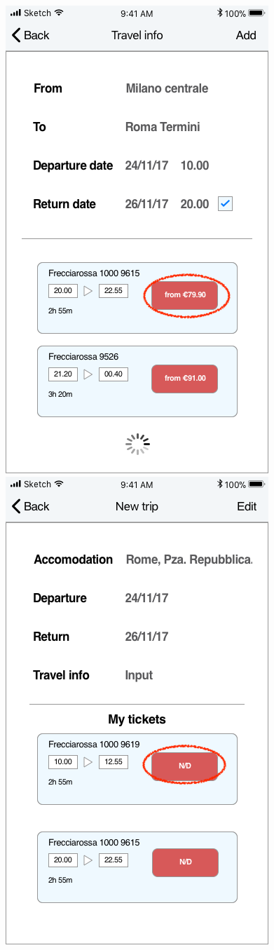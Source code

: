 \begin{figure}[H]
	\includegraphics[scale=0.23]{Images/Interface/Trips/12_return}
	\hspace{0.5cm}
	\includegraphics[scale=0.23]{Images/Interface/Trips/13_pnr_to_define}

\end{figure}
